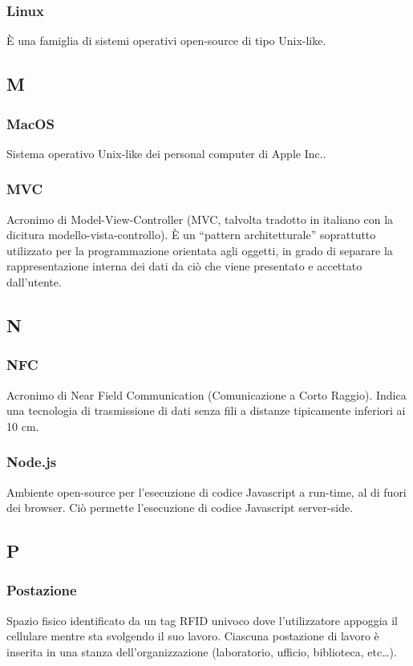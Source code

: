 \subsubsection*{Linux} È una famiglia di sistemi operativi open-source di tipo Unix-like.
\subsection*{M}
\subsubsection*{MacOS} Sistema operativo Unix-like dei personal computer di Apple Inc..
\subsubsection*{MVC} Acronimo di Model-View-Controller (MVC, talvolta tradotto in italiano con la dicitura modello-vista-controllo). È un “pattern architetturale”  soprattutto utilizzato per la programmazione orientata agli oggetti, in grado di separare la rappresentazione interna dei dati da ciò che viene presentato e accettato dall'utente.
\subsection*{N}
\subsubsection*{NFC} Acronimo di Near Field Communication (Comunicazione a Corto Raggio). Indica una tecnologia di trasmissione di dati senza fili a distanze tipicamente inferiori ai 10 cm.
\subsubsection*{Node.js} Ambiente open-source per l'esecuzione di codice Javascript a run-time, al di fuori dei browser. Ciò permette l'esecuzione di codice Javascript server-side.
\subsection*{P}
\subsubsection*{Postazione} Spazio fisico identificato da un tag RFID univoco dove l’utilizzatore appoggia il cellulare mentre sta svolgendo il suo lavoro. Ciascuna postazione di lavoro è inserita in una stanza
dell'organizzazione (laboratorio, ufficio, biblioteca, etc\dots).
